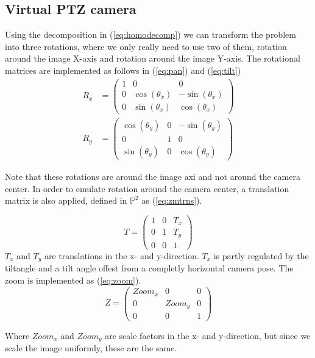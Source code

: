 \subsection{Virtual PTZ camera}
Using the decomposition in (\ref{eq:homodecomp}) we can transform the problem into three rotations, where we only really need to use two of them, rotation around the image X-axis and rotation around the image Y-axis. The rotational matrices are implemented as follows in (\ref{eq:pan}) and (\ref{eq:tilt})
	\begin{align}
		R_x &=\begin{pmatrix}1 & 0 & 0 \\
			0 & \cos(\theta_x) & -\sin(\theta_x) \\
			0 & \sin(\theta_x) & \cos(\theta_x)
		\end{pmatrix} \label{eq:pan}\\
		R_y&=\begin{pmatrix} \cos(\theta_y) & 0 & -\sin(\theta_y) \\
			0 & 1 & 0 \\
			\sin(\theta_y) & 0 & \cos(\theta_y)
		\end{pmatrix} \label{eq:tilt}
	\end{align}

	Note that these rotations are around the image axi and not around the camera center. In order to emulate rotation around the camera center, a translation matrix is also applied, defined in $\mathbb{P}^2$ as (\ref{eq:zmtrns}).

	\begin{equation}
		T=\begin{pmatrix}
			1 & 0 & T_x \\
			0 & 1 & T_y \\
			0 & 0 & 1
		\end{pmatrix} \label{eq:zmtrns}
	\end{equation}
	$T_x$ and $T_y$ are translations in the x- and y-direction. $T_x$ is partly regulated by the tiltangle and a tilt angle offest from a completly horizontal camera pose.
	The zoom is implemented as (\ref{eq:zoom}).
	\begin{equation}
		Z=\begin{pmatrix}
			Zoom_x & 0 & 0\\
			0 & Zoom_y & 0\\
			0 & 0 & 1
		\end{pmatrix}
	\end{equation}

	Where $Zoom_x$ and $Zoom_y$ are scale factors in the x- and y-direction, but since we scale the image uniformly, these are the same. 

